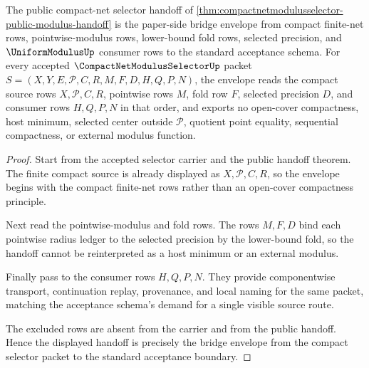\begin{theorem}
\label{thm:compact-net-modulus-selector-bridge-envelope}
The public compact-net selector handoff of \autoref{thm:compactnetmodulusselector-public-modulus-handoff} is the paper-side bridge envelope from compact finite-net rows, pointwise-modulus rows, lower-bound fold rows, selected precision, and $\UniformModulusUp$ consumer rows to the standard acceptance schema. For every accepted $\CompactNetModulusSelectorUp$ packet $S=(X,Y,E,\mathcal{P},C,R,M,F,D,H,Q,P,N)$, the envelope reads the compact source rows $X,\mathcal{P},C,R$, pointwise rows $M$, fold row $F$, selected precision $D$, and consumer rows $H,Q,P,N$ in that order, and exports no open-cover compactness, host minimum, selected center outside $\mathcal{P}$, quotient point equality, sequential compactness, or external modulus function.
\end{theorem}
\begin{proof}
Start from the accepted selector carrier and the public handoff theorem. The finite compact source is already displayed as $X,\mathcal{P},C,R$, so the envelope begins with the compact finite-net rows rather than an open-cover compactness principle.

Next read the pointwise-modulus and fold rows. The rows $M,F,D$ bind each pointwise radius ledger to the selected precision by the lower-bound fold, so the handoff cannot be reinterpreted as a host minimum or an external modulus.

Finally pass to the consumer rows $H,Q,P,N$. They provide componentwise transport, continuation replay, provenance, and local naming for the same packet, matching the acceptance schema's demand for a single visible source route.

The excluded rows are absent from the carrier and from the public handoff. Hence the displayed handoff is precisely the bridge envelope from the compact selector packet to the standard acceptance boundary.
\end{proof}
